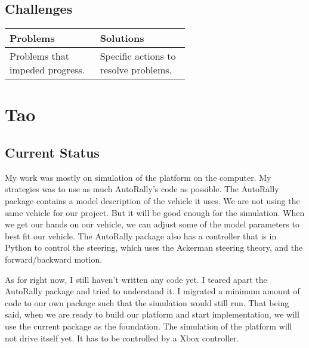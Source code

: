 \documentclass[compsoc,draftclsnofoot,onecolumn,10pt]{IEEEtran}
\begin{document}
	\subsection{Challenges}
		
		\begin{tabular}{|p{0.3\linewidth}|p{0.3\linewidth}|}
			\hline
			\textbf{Problems} & \textbf{Solutions}\\
			\hline
			Problems that impeded progress. & Specific actions to resolve problems.\\
			\hline
						
		\end{tabular}
		
\section{Tao}
\subsection{Current Status}
My work was mostly on simulation of the platform on the computer. My strategies was to use as much AutoRally's code as possible. The AutoRally package contains a model description of the vehicle it uses. We are not using the same vehicle for our project. But it will be good enough for the simulation. When we get our hands on our vehicle, we can adjust some of the model parameters to best fit our vehicle. The AutoRally package also has a controller that is in Python to control the steering, which uses the Ackerman steering theory, and the forward/backward motion. \par     
As for right now, I still haven't written any code yet. I teared apart the AutoRally package and tried to understand it. I migrated a minimum amount of code to our own package such that the simulation would still run. That being said, when we are ready to build our platform and start implementation, we will use the current package as the foundation. The simulation of the platform will not drive itself yet. It has to be controlled by a Xbox controller. \par 
\end{document}
